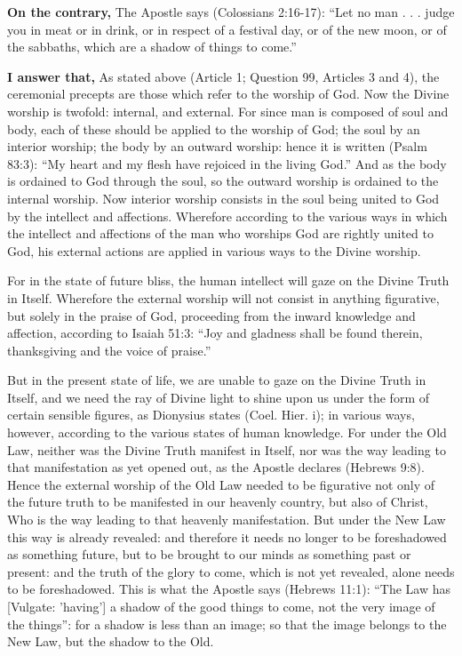 \textbf{On the contrary,} The Apostle says (Colossians 2:16-17): ``Let no man . . . judge you in meat or in drink, or in respect of a festival day, or of the new moon, or of the sabbaths, which are a shadow of things to come.''

\textbf{I answer that,} As stated above (Article 1; Question 99, Articles 3 and 4), the ceremonial precepts are those which refer to the worship of God. Now the Divine worship is twofold: internal, and external. For since man is composed of soul and body, each of these should be applied to the worship of God; the soul by an interior worship; the body by an outward worship: hence it is written (Psalm 83:3): ``My heart and my flesh have rejoiced in the living God.'' And as the body is ordained to God through the soul, so the outward worship is ordained to the internal worship. Now interior worship consists in the soul being united to God by the intellect and affections. Wherefore according to the various ways in which the intellect and affections of the man who worships God are rightly united to God, his external actions are applied in various ways to the Divine worship.

For in the state of future bliss, the human intellect will gaze on the Divine Truth in Itself. Wherefore the external worship will not consist in anything figurative, but solely in the praise of God, proceeding from the inward knowledge and affection, according to Isaiah 51:3: ``Joy and gladness shall be found therein, thanksgiving and the voice of praise.''

But in the present state of life, we are unable to gaze on the Divine Truth in Itself, and we need the ray of Divine light to shine upon us under the form of certain sensible figures, as Dionysius states (Coel. Hier. i); in various ways, however, according to the various states of human knowledge. For under the Old Law, neither was the Divine Truth manifest in Itself, nor was the way leading to that manifestation as yet opened out, as the Apostle declares (Hebrews 9:8). Hence the external worship of the Old Law needed to be figurative not only of the future truth to be manifested in our heavenly country, but also of Christ, Who is the way leading to that heavenly manifestation. But under the New Law this way is already revealed: and therefore it needs no longer to be foreshadowed as something future, but to be brought to our minds as something past or present: and the truth of the glory to come, which is not yet revealed, alone needs to be foreshadowed. This is what the Apostle says (Hebrews 11:1): ``The Law has [Vulgate: 'having'] a shadow of the good things to come, not the very image of the things'': for a shadow is less than an image; so that the image belongs to the New Law, but the shadow to the Old.

